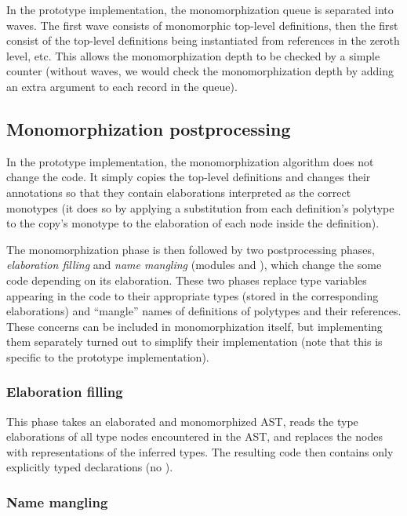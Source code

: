 In the prototype implementation, the monomorphization queue is separated into waves. The first wave consists of monomorphic top-level definitions, then the first consist of the top-level definitions being instantiated from references in the zeroth level, etc. This allows the monomorphization depth to be checked by a simple counter (without waves, we would check the monomorphization depth by adding an extra argument to each record in the queue).

\subsection{Monomorphization postprocessing}

In the prototype implementation, the monomorphization algorithm does not change the code. It simply copies the top-level definitions and changes their annotations so that they contain elaborations interpreted as the correct monotypes (it does so by applying a substitution from each definition's polytype to the copy's monotype to the elaboration of each node inside the definition).

The monomorphization phase is then followed by two postprocessing phases, \emph{elaboration filling} and \emph{name mangling} (modules  and ), which change the some code depending on its elaboration. These two phases replace type variables appearing in the code to their appropriate types (stored in the corresponding elaborations) and ``mangle'' names of definitions of polytypes and their references. These concerns can be included in monomorphization itself, but implementing them separately turned out to simplify their implementation (note that this is specific to the prototype implementation).

\subsubsection{Elaboration filling}

This phase takes an elaborated and monomorphized AST, reads the type elaborations of all type nodes encountered in the AST, and replaces the nodes with representations of the inferred types. The resulting code then contains only explicitly typed declarations (no ).

\subsubsection{Name mangling}
\label{sec:mangling}

